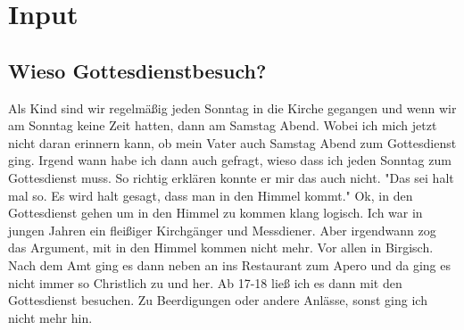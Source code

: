 \section{ Input }
\begin{spacing}{1.5}
\subsection{ Wieso Gottesdienstbesuch? }
Als Kind sind wir regelmäßig jeden Sonntag in die Kirche gegangen und wenn wir am Sonntag keine Zeit hatten, dann am Samstag Abend. Wobei ich mich jetzt nicht daran erinnern kann, ob mein Vater auch Samstag Abend zum Gottesdienst ging. Irgend wann habe ich dann auch gefragt, wieso dass ich jeden Sonntag zum Gottesdienst muss. So richtig erklären konnte er mir das auch nicht. "Das sei halt mal so. Es wird halt gesagt, dass man in den Himmel kommt." Ok, in den Gottesdienst gehen um in den Himmel zu kommen klang logisch. Ich war in jungen Jahren ein fleißiger Kirchgänger und Messdiener. Aber irgendwann zog das Argument, mit in den Himmel kommen nicht mehr. Vor allen in Birgisch. Nach dem Amt ging es dann neben an ins Restaurant zum Apero und da ging es nicht immer so Christlich zu und her. Ab 17-18 ließ ich es dann mit den Gottesdienst besuchen. Zu Beerdigungen oder andere Anlässe, sonst ging ich nicht mehr hin.


\end{spacing}
